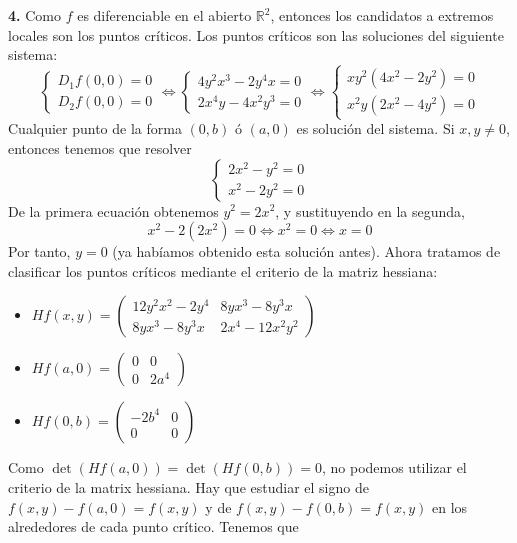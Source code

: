 \documentclass[12pt]{report}
\newcommand{\R}{\mathbb R}
\begin{document}
\vspace{2mm}
\textbf{4. } Como $f$ es diferenciable en el abierto $\R^2$, entonces los candidatos a extremos locales son los puntos críticos. Los puntos críticos son las soluciones del siguiente sistema:
\[
\begin{cases}
    D_1f(0,0) = 0 \\
    D_2f(0,0) = 0
\end{cases} \iff \begin{cases}
    4y^2x^3 -2y^4x = 0 \\
    2x^4y-4x^2y^3 = 0
\end{cases} \iff \begin{cases}
    xy^2(4x^2-2y^2) = 0 \\
    x^2y(2x^2-4y^2) = 0
\end{cases}
\]
Cualquier punto de la forma $(0,b)$ ó $(a,0)$ es solución del sistema. Si $x,y \neq 0$, entonces tenemos que resolver
\[
\begin{cases}
    2x^2-y^2 = 0 \\
    x^2-2y^2 = 0
\end{cases}
\]
De la primera ecuación obtenemos $y^2 = 2x^2$, y sustituyendo en la segunda,
\[x^2 -2(2x^2) = 0 \iff x^2 = 0 \iff x = 0\]
Por tanto, $y = 0$ (ya habíamos obtenido esta solución antes). Ahora tratamos de clasificar los puntos críticos mediante el criterio de la matriz hessiana:
\begin{itemize}
    \item $\displaystyle Hf(x,y) = 
    \begin{pmatrix}
    12y^2x^2 -2y^4 & 8yx^3-8y^3x \\
    8yx^3-8y^3x & 2x^4-12x^2y^2
    \end{pmatrix}
    $
    \item $\displaystyle Hf(a,0) = 
    \begin{pmatrix}
    0 & 0 \\
    0 & 2a^4
    \end{pmatrix}
    $
    \item $\displaystyle Hf(0,b) = 
    \begin{pmatrix}
    -2b^4 & 0 \\
    0 & 0
    \end{pmatrix}
    $
\end{itemize}
Como $\det(Hf(a,0)) = \det(Hf(0,b)) = 0$, no podemos utilizar el criterio de la matrix hessiana. Hay que estudiar el signo de $f(x,y)-f(a,0) = f(x,y)$ y de $f(x,y)-f(0,b) = f(x,y)$ en los alrededores de cada punto crítico. Tenemos que
\end{document}
